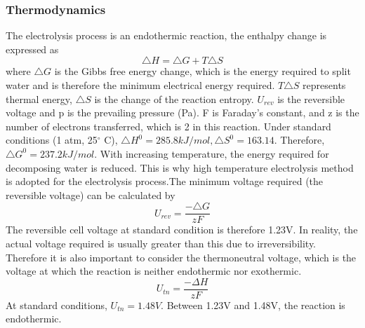 \subsubsection{Thermodynamics} 
The electrolysis process is an endothermic reaction, the enthalpy change is expressed as\cite{gibbs}
\begin{equation} 
\triangle H =\triangle G + T\triangle S 
\end{equation}
where $\triangle G $ is the Gibbs free energy change, which is the energy required to split water and is therefore the minimum electrical energy required. $T\triangle S$ represents thermal energy, $\triangle S$ is the change of the reaction entropy. $U_{rev}$ is the reversible voltage and p is the prevailing pressure (Pa). F is Faraday's constant, and z is the number of electrons transferred, which is 2 in this reaction.\cite{gibbs}  
Under standard conditions (1 atm, 25$^{\circ}$ C), $\triangle H^0 = 285.8 kJ/mol, \triangle S^0 = 163.14$. Therefore, $\triangle G^0 = 237.2 kJ/mol.$ With increasing temperature, the energy required for decomposing water is reduced. This is why high temperature electrolysis method is adopted for the electrolysis process.The minimum voltage required (the reversible voltage) can be calculated by
\begin{equation} 
U_{rev} =\frac {-\triangle G} {zF} 
\end{equation} 
The reversible cell voltage at standard condition is therefore 1.23V. In reality, the actual voltage required is usually greater than this due to irreversibility. Therefore it is also important to consider the thermoneutral voltage, which is the voltage at which the reaction is neither endothermic nor exothermic. 
\begin{equation} 
U_{tn}=\frac{-\Delta H} {zF}
\end{equation} 
At standard conditions, $U_{tn} = 1.48V.$ Between 1.23V and 1.48V, the reaction is endothermic.\cite{thermoneutral} 

